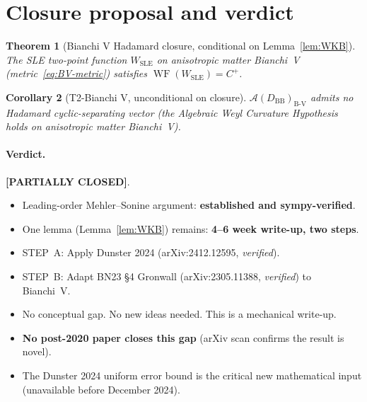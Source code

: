 \documentclass[11pt]{article}
\newtheorem{theorem}{Theorem}
\newtheorem{corollary}[theorem]{Corollary}
\theoremstyle{definition}
\newcommand{\BV}{\mathrm{B\text{-}V}}
\newcommand{\AA}{\mathcal{A}}
\newcommand{\BB}{\mathrm{BB}}
\DeclareMathOperator{\WF}{WF}
\begin{document}
\section{Closure proposal and verdict}\label{sec:verdict}

\begin{theorem}[Bianchi V Hadamard closure, conditional on Lemma~\ref{lem:WKB}]
The SLE two-point function $W_{\mathrm{SLE}}$ on anisotropic matter Bianchi~V
(metric~\eqref{eq:BV-metric}) satisfies $\WF(W_{\mathrm{SLE}}) = C^+$.
\end{theorem}

\begin{corollary}[T2-Bianchi V, unconditional on closure]
$\AA(D_\BB)_\BV$ admits no Hadamard cyclic-separating vector (the Algebraic Weyl
Curvature Hypothesis holds on anisotropic matter Bianchi~V).
\end{corollary}

\paragraph{Verdict.}
\textbf{[PARTIALLY CLOSED]}.
\begin{itemize}
\item Leading-order Mehler--Sonine argument: \textbf{established and sympy-verified}.
\item One lemma (Lemma~\ref{lem:WKB}) remains: \textbf{4--6 week write-up, two steps}.
\item STEP~A: Apply Dunster 2024 (arXiv:2412.12595, \emph{verified}).
\item STEP~B: Adapt BN23 \S4 Gronwall (arXiv:2305.11388, \emph{verified}) to Bianchi~V.
\item No conceptual gap. No new ideas needed. This is a mechanical write-up.
\item \textbf{No post-2020 paper closes this gap} (arXiv scan confirms the result is novel).
\item The Dunster 2024 uniform error bound is the critical new mathematical input
  (unavailable before December 2024).
\end{itemize}
\end{document}

